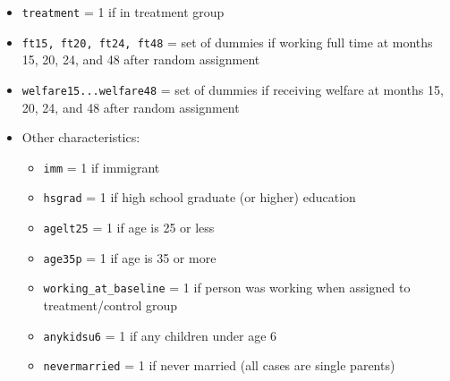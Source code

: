\documentclass[12pt]{article}
\begin{document}
\begin{itemize}
    \item \texttt{treatment} = 1 if in treatment group
    \item \texttt{ft15, ft20, ft24, ft48} = set of dummies if working full time at months 15, 20, 24, and 48 after random assignment
    \item \texttt{welfare15...welfare48} = set of dummies if receiving welfare at months 15, 20, 24, and 48 after random assignment
    \item Other characteristics:
    \begin{itemize}
        \item \texttt{imm} = 1 if immigrant
        \item \texttt{hsgrad} = 1 if high school graduate (or higher) education
        \item \texttt{agelt25} = 1 if age is 25 or less
        \item \texttt{age35p} = 1 if age is 35 or more
        \item \texttt{working\_at\_baseline} = 1 if person was working when assigned to treatment/control group
        \item \texttt{anykidsu6} = 1 if any children under age 6
        \item \texttt{nevermarried} = 1 if never married (all cases are single parents)
    \end{itemize}
\end{itemize}
\end{document}
